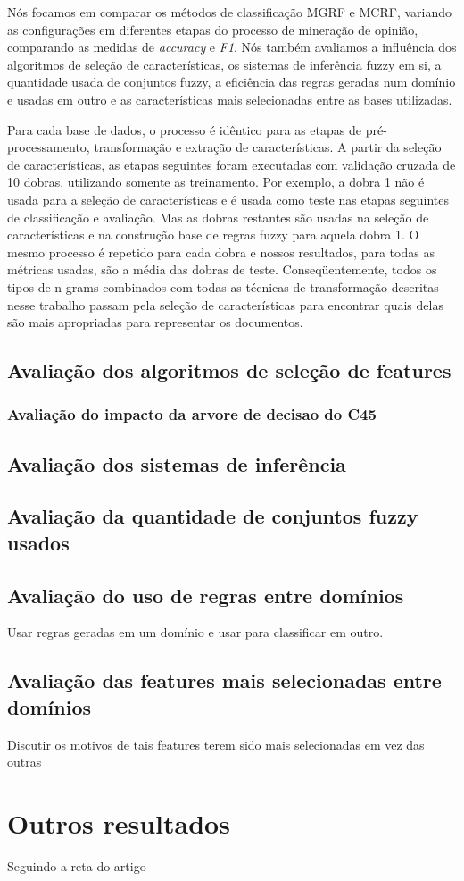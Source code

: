 Nós focamos em comparar os métodos de classificação MGRF e MCRF, variando as configurações em diferentes etapas do processo de mineração de opinião, comparando as medidas de \textit{accuracy} e \textit{F1}. Nós também avaliamos a influência dos algoritmos de seleção de características, os sistemas de inferência fuzzy em si, a quantidade usada de conjuntos fuzzy, a eficiência das regras geradas num domínio e usadas em outro e as características mais selecionadas entre as bases utilizadas. 

Para cada base de dados, o processo é idêntico para as etapas de pré-processamento, transformação e extração de características. A partir da seleção de características, as etapas seguintes foram executadas com validação cruzada de 10 dobras, utilizando somente as treinamento. Por exemplo, a dobra 1 não é usada para a seleção de características e é usada como teste nas etapas seguintes de classificação e avaliação. Mas as dobras restantes são usadas na seleção de características e na construção base de regras fuzzy para aquela dobra 1. O mesmo processo é repetido para cada dobra e nossos resultados, para todas as métricas usadas, são a média das dobras de teste. Conseqüentemente, todos os tipos de n-grams combinados com todas as técnicas de transformação descritas nesse trabalho passam pela seleção de características para encontrar quais delas são mais apropriadas para representar os documentos. 

\subsection{Avaliação dos algoritmos de seleção de features}

\subsubsection{Avaliação do impacto da arvore de decisao do C45}

\subsection{Avaliação dos sistemas de inferência}

\subsection{Avaliação da quantidade de conjuntos fuzzy usados}

\subsection{Avaliação do uso de regras entre domínios}

Usar regras geradas em um domínio e usar para classificar em outro.

\subsection{Avaliação das features mais selecionadas entre domínios}

Discutir os motivos de tais features terem sido mais selecionadas em vez das outras

\section{Outros resultados}

Seguindo a reta do artigo

